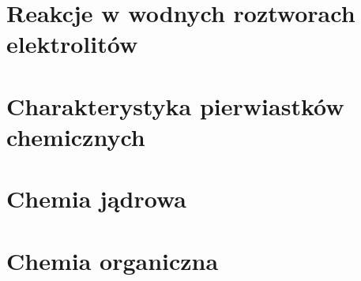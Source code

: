 \documentclass{createspace}
\begin{document}
\chapter{Reakcje w wodnych roztworach elektrolitów}

\chapter{Charakterystyka pierwiastków chemicznych}

\chapter{Chemia jądrowa}

\chapter{Chemia organiczna}
\end{document}
